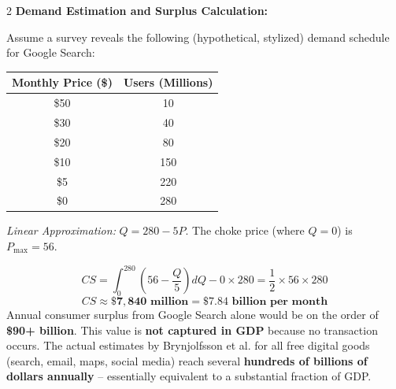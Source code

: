 \documentclass[10pt,a4paper]{article}
\begin{document}
\begin{multicols}{2}
\textbf{Demand Estimation and Surplus Calculation:}

Assume a survey reveals the following (hypothetical, stylized) demand schedule for Google Search:

\begin{center}
\begin{tabular}{@{ }c@{ }c@{ }}
\toprule
\textbf{Monthly Price (\$)} & \textbf{Users (Millions)} \\
\midrule
\$50  & 10 \\
\$30  & 40 \\
\$20  & 80 \\
\$10  & 150 \\
\$5   & 220 \\
\$0   & 280 \\
\bottomrule
\end{tabular}
\end{center}

\textit{Linear Approximation:} $Q = 280 - 5P$. The choke price (where $Q=0$) is $P_{\text{max}} = 56$.

\[
CS = \int_{0}^{280} \left(56 - \frac{Q}{5}\right) dQ - 0 \times 280 = \frac{1}{2} \times 56 \times 280
\]
\[
CS \approx \mathbf{\$7,840 \text{ million}} = \mathbf{\$7.84 \text{ billion per month}}
\]
Annual consumer surplus from Google Search alone would be on the order of \textbf{\$90+ billion}. This value is \textbf{not captured in GDP} because no transaction occurs. The actual estimates by Brynjolfsson et al. for all free digital goods (search, email, maps, social media) reach several \textbf{hundreds of billions of dollars annually} -- essentially equivalent to a substantial fraction of GDP.


\end{multicols}
\end{document}
